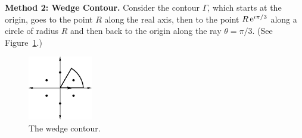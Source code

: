 {\begin{Solution}
  \textbf{Method 2: Wedge Contour.}
  Consider the contour $\Gamma$, which starts at the origin, goes to the point
  $R$ along the real axis, then to the point $R \mathop{\mathrm{e}}\nolimits^{\imath \pi / 3}$ along
  a circle of radius $R$ and then back to the origin along the ray
  $\theta = \pi / 3$.  (See Figure~\ref{wedge_1x6}.)
  \begin{figure}[tb!]
    \begin{center}
      \includegraphics[width=0.25\textwidth]{fcv/residue/wedge_1x6}
    \end{center}
    \caption{The wedge contour.}
    \label{wedge_1x6}
  \end{figure}


\end{Solution}}
